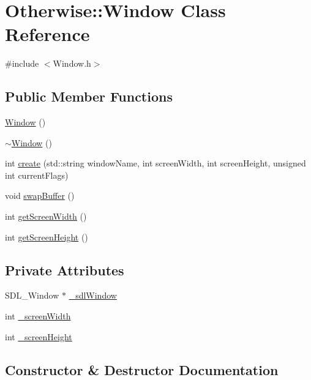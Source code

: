 \hypertarget{class_otherwise_1_1_window}{}\section{Otherwise\+:\+:Window Class Reference}
\label{class_otherwise_1_1_window}


{\ttfamily \#include $<$Window.\+h$>$}

\subsection*{Public Member Functions}
\begin{DoxyCompactItemize}
\item 
\hyperlink{class_otherwise_1_1_window_a1e7371a2bac6b4a813974ba2de922df1}{Window} ()
\item 
\hyperlink{class_otherwise_1_1_window_a84ac46fefa63b488c270775ff24eb1c7}{$\sim$\+Window} ()
\item 
int \hyperlink{class_otherwise_1_1_window_af731dfe458465b7e3de59563b5e195f7}{create} (std\+::string window\+Name, int screen\+Width, int screen\+Height, unsigned int current\+Flags)
\item 
void \hyperlink{class_otherwise_1_1_window_a354b7c67f2a4813bca0fcea92b2a6b3d}{swap\+Buffer} ()
\item 
int \hyperlink{class_otherwise_1_1_window_a627abd76ae90a916be160bf035fe77fe}{get\+Screen\+Width} ()
\item 
int \hyperlink{class_otherwise_1_1_window_ad158ab3898de55b8f845512f928ea9a4}{get\+Screen\+Height} ()
\end{DoxyCompactItemize}
\subsection*{Private Attributes}
\begin{DoxyCompactItemize}
\item 
S\+D\+L\+\_\+\+Window $\ast$ \hyperlink{class_otherwise_1_1_window_a3666189208b2c94d5093b5ac659f51e1}{\+\_\+sdl\+Window}
\item 
int \hyperlink{class_otherwise_1_1_window_ac08523329656084bc64eb3d73e80cdf3}{\+\_\+screen\+Width}
\item 
int \hyperlink{class_otherwise_1_1_window_a0939387dba9fd01cc8e3182b183fb749}{\+\_\+screen\+Height}
\end{DoxyCompactItemize}


\subsection{Constructor \& Destructor Documentation}
\mbox{\label{class_otherwise_1_1_window_a1e7371a2bac6b4a813974ba2de922df1}} 
